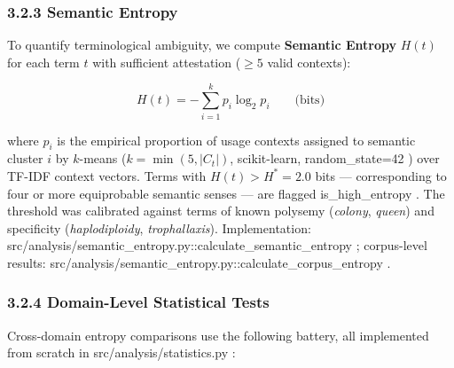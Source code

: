 \documentclass[
]{article}
\numberwithin{equation}{section}
\renewcommand{\texttt}[1]{%
    \colorbox{codebg}{\color{codefg}\ttfamily #1}%
}
\begin{document}
\subsubsection{3.2.3 Semantic Entropy}\label{semantic-entropy}

To quantify terminological ambiguity, we compute \textbf{Semantic
Entropy} \(H(t)\) for each term \(t\) with sufficient attestation
(\(\geq 5\) valid contexts):

\begin{equation}\label{eq:semantic_entropy}
H(t) = -\sum_{i=1}^{k} p_i \log_2 p_i \qquad \text{(bits)}
\end{equation}

where \(p_i\) is the empirical proportion of usage contexts assigned to
semantic cluster \(i\) by \(k\)-means (\(k = \min(5, |C_t|)\),
scikit-learn, \texttt{random\_state=42}) over TF-IDF context vectors.
Terms with \(H(t) > H^* = 2.0\) bits --- corresponding to four or more
equiprobable semantic senses --- are flagged \texttt{is\_high\_entropy}.
The threshold was calibrated against terms of known polysemy
(\emph{colony}, \emph{queen}) and specificity (\emph{haplodiploidy},
\emph{trophallaxis}). Implementation:
\texttt{src/analysis/semantic\_entropy.py::calculate\_semantic\_entropy};
corpus-level results:
\texttt{src/analysis/semantic\_entropy.py::calculate\_corpus\_entropy}.

\subsubsection{3.2.4 Domain-Level Statistical
Tests}\label{domain-level-statistical-tests}

Cross-domain entropy comparisons use the following battery, all
implemented from scratch in \texttt{src/analysis/statistics.py}:
\end{document}

